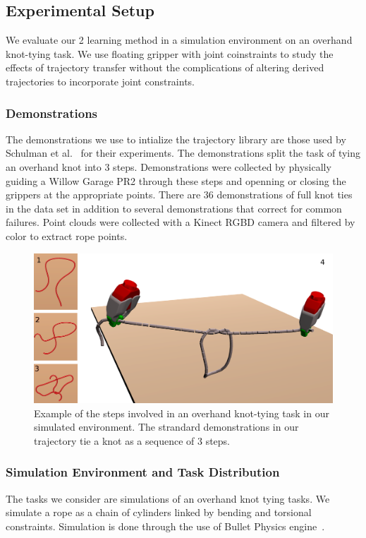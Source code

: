 \subsection{Experimental Setup}
We evaluate our 2 learning method in a simulation environment on an overhand knot-tying task.
We use floating gripper with joint coinstraints to study the effects of trajectory transfer
without the complications of altering derived trajectories to incorporate joint constraints.

\subsubsection{Demonstrations}
The demonstrations we use to intialize the trajectory library are those used by
Schulman et al.~\cite{Schulmanetal_ISRR2013} for their experiments. The demonstrations
split the task of tying an overhand knot into 3 steps. Demonstrations were collected
by physically guiding a Willow Garage PR2 through these steps and openning or closing 
the grippers at the appropriate points. There are 36 demonstrations of full knot ties
in the data set in addition to several demonstrations that correct for common failures.
Point clouds were collected with a Kinect RGBD camera and filtered by color to extract
rope points. 

\begin{figure}
  \includegraphics[width=\linewidth]{figs/cov.png}
  \caption{Example of the steps involved in an overhand knot-tying task in our simulated
           environment. The strandard demonstrations in our trajectory tie a knot as a 
           sequence of 3 steps.}
  \label{fig:knot_steps}
\end{figure}


\subsubsection{Simulation Environment and Task Distribution} 
The tasks we consider are simulations of an overhand knot tying tasks. 
We simulate a rope as a chain of cylinders linked by bending and torsional constraints.
Simulation is done through the use of Bullet Physics engine~\cite{Bullet_Physics}.

